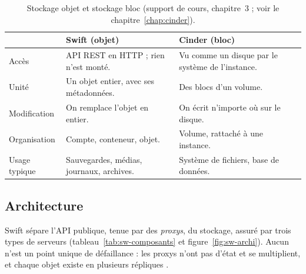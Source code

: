 \begin{table}[!ht]
\centering
\renewcommand{\arraystretch}{1.3}
\begin{tabular}{@{}>{\raggedright\arraybackslash}p{2.8cm}>{\raggedright\arraybackslash}p{6.0cm}>{\raggedright\arraybackslash}p{6.7cm}@{}}
\toprule
 & \textbf{Swift (objet)} & \textbf{Cinder (bloc)} \\
\midrule
Accès & API REST en HTTP ; rien n'est monté. & Vu comme un disque par le système de l'instance. \\
Unité & Un objet entier, avec ses métadonnées. & Des blocs d'un volume. \\
Modification & On remplace l'objet en entier. & On écrit n'importe où sur le disque. \\
Organisation & Compte, conteneur, objet. & Volume, rattaché à une instance. \\
Usage typique & Sauvegardes, médias, journaux, archives. & Système de fichiers, base de données. \\
\bottomrule
\end{tabular}
\caption{Stockage objet et stockage bloc (support de cours, chapitre~3 ; voir le chapitre~\ref{chap:cinder}).}
\label{tab:sw-bloc}
\end{table}

\subsection{Architecture}\label{sec:sw-archi}

Swift sépare l'API publique, tenue par des \emph{proxys}, du stockage, assuré par trois types de serveurs (tableau~\ref{tab:sw-composants}
et figure~\ref{fig:sw-archi}). Aucun n'est un point unique de défaillance : les proxys n'ont pas d'état et se multiplient, et
chaque objet existe en plusieurs répliques \parencite{swift-architecture}.

